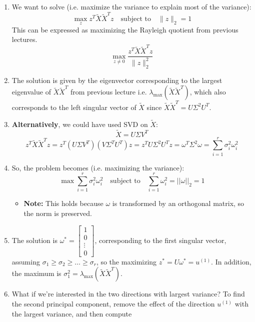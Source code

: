 \begin{example}
\begin{enumerate}
        \item We want to solve (i.e. maximize the variance to explain most of the variance):
        \[
        \max_{z} z^T \tilde{X} \tilde{X}^T z \quad \text{subject to} \quad \|z\|_2 = 1
        \]
        This can be expressed as maximizing the Rayleigh quotient from previous lectures.
        \[
        \max_{z \neq 0} \frac{z^T \tilde{X} \tilde{X}^T z}{\|z\|_2^2}
        \]
        
       \item The solution is given by the eigenvector corresponding to the largest eigenvalue of \( \tilde{X} \tilde{X}^T \) from previous lecture i.e. $\lambda_{\max} (\tilde{X} \tilde{X}^T)$, which also corresponds to the left singular vector of \( \tilde{X} \) since $\tilde{X} \tilde{X}^T = U \Sigma^2 U^T$.
        
        \item \textbf{Alternatively}, we could have used SVD on \( \tilde{X} \):
        \[
        \tilde{X} = U \Sigma V^T
        \]
        \[
        z^T \tilde{X} \tilde{X}^T z = z^T \left( U \Sigma V^T \right) \left( V \Sigma^T U^T \right) z = z^T U \Sigma^2 U^T z = \omega^T \Sigma^2 \omega = \sum_{i=1}^{r} \sigma_i^2 \omega_i^2
        \]
        
        \item So, the problem becomes (i.e. maximizing the variance):
        \[
        \max \sum_{i=1}^{r} \sigma_i^2 \omega_i^2 \quad \text{subject to} \quad \sum_{i=1}^{r} \omega_i^2 = ||\omega||_2 = 1
        \]
        \begin{itemize}
            \item \textbf{Note:} This holds because $\omega$ is transformed by an orthogonal matrix, so the norm is preserved.
        \end{itemize}
        
        \item The solution is \( \omega^* = \begin{bmatrix} 1 \\ 0 \\ \vdots \\ 0 \end{bmatrix} \), corresponding to the first singular vector, assuming $\sigma_1 \geq \sigma_2 \geq \ldots \geq \sigma_r$, so the maximizing $z^* = U \omega^* = u^{(1)}$.
        In addition, the maximum is \( \sigma_1^2 = \lambda_{\max} (\tilde{X} \tilde{X}^T) \).
    
        \item What if we're interested in the two directions with largest variance? To find the second principal component, remove the effect of the direction $u^{(1)}$ with the largest variance, and then compute


\end{enumerate}
\end{example}
